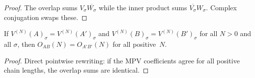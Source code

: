 \begin{proof}\leanok
    The overlap sums $V_\sigma \overline{W_\sigma}$
    while the inner product sums $\overline{V_\sigma} W_\sigma$.
    Complex conjugation swaps these.
\end{proof}

\begin{lemma}%
    \label{lem:overlap_eq_of_pos_mpv}
    \leanok
    If $V^{(N)}(A)_\sigma = V^{(N)}(A')_\sigma$ and
    $V^{(N)}(B)_\sigma = V^{(N)}(B')_\sigma$ for all $N > 0$
    and all $\sigma$, then $O_{AB}(N) = O_{A'B'}(N)$ for all
    positive~$N$.
\end{lemma}
\begin{proof}\leanok
    Direct pointwise rewriting: if the MPV coefficients agree for
    all positive chain lengths, the overlap sums are identical.
\end{proof}
